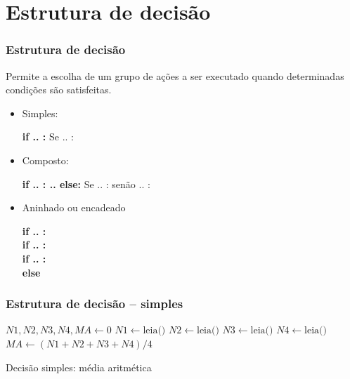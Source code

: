 \documentclass{beamer}
\begin{document}
\section{Estrutura de decisão}

\begin{frame}[fragile]
\frametitle{Estrutura de decisão}
\small
\vfill \begin{block}{}
 Permite a escolha de um grupo de ações a ser executado quando determinadas condições são satisfeitas.
\end{block}


\begin{itemize}
 \scriptsize
 \vfill \item Simples:
 
 \textbf{if .. :} Se .. :
 
 
 \vfill \item Composto:
 
 \textbf{if .. : .. else:}  Se .. :  senão .. :
 
 \vfill \item Aninhado ou encadeado
 
 \textbf{if .. :} \\
 \hspace{1cm} \textbf{if .. :} \\
 \hspace{2cm} \textbf{if .. :} \\ 
 \hspace{2cm} \textbf{else} \\
 
\end{itemize}
\end{frame}

\begin{frame}[fragile]
\frametitle{Estrutura de decisão -- simples}

\begin{algorithm}[H]
\scriptsize
\DontPrintSemicolon
{}
\BlankLine
{}
$N1, N2, N3, N4, MA \gets 0$\;
\BlankLine
{}
$N1 \gets \text{leia()}$\;
$N2 \gets \text{leia()}$\;
$N3 \gets \text{leia()}$\;
$N4 \gets \text{leia()}$\;
\BlankLine
{}
$MA \gets (N1 + N2 + N3 + N4) / 4$\;
\BlankLine
{}
\caption{Decisão simples: média aritmética}
\label{alg:decisao-simples}
\end{algorithm}
\end{frame}
\end{document}
